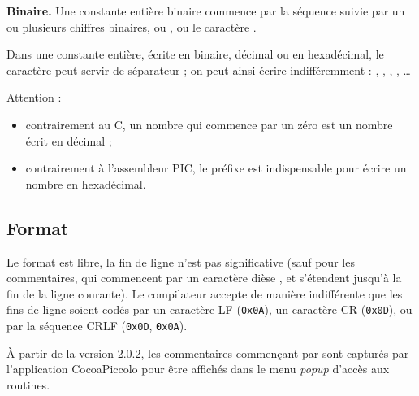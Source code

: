 \textbf{Binaire.} Une constante entière binaire commence par la séquence  suivie par un ou plusieurs chiffres binaires,  ou , ou le caractère \piccolo{\_}.

Dans une constante entière, écrite en binaire, décimal ou en hexadécimal, le caractère \piccolo{\_} peut servir de séparateur ; on peut ainsi écrire indifféremment : , , , , \dots

Attention :
\begin{itemize}
  \item contrairement au C, un nombre qui commence par un zéro est un nombre écrit en décimal ;
  \item contrairement à l’assembleur PIC, le préfixe  est indispensable pour écrire un nombre en hexadécimal.
\end{itemize}

\subsection{Format}

Le format est libre, la fin de ligne n’est pas significative (sauf pour les commentaires, qui commencent par un caractère dièse \piccolo{\#}, et s’étendent jusqu’à la fin de la ligne courante). Le compilateur accepte de manière indifférente que les fins de ligne soient codés par un caractère LF (\texttt{0x0A}), un caractère CR (\texttt{0x0D}), ou par la séquence CRLF (\texttt{0x0D}, \texttt{0x0A}).

À partir de la version 2.0.2, les commentaires commençant par \piccolo{\#!} sont capturés par l'application CocoaPiccolo pour être affichés dans le menu \emph{popup} d'accès aux routines.

